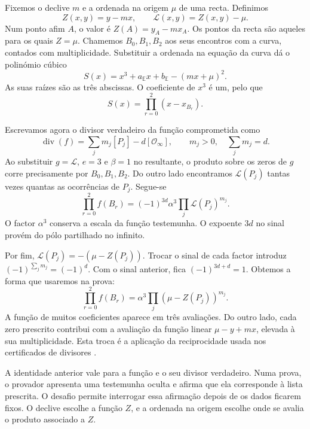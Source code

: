 Fixemos o declive \(m\) e a ordenada na origem
\(\mu\) de uma recta. Definimos
\begin{equation}
 Z(x,y)=y-mx,
 \qquad
 \mathcal L(x,y)=Z(x,y)-\mu.
 \label{eq:fcmp-random-line}
\end{equation}
Num ponto afim \(A\), o valor é
\(Z(A)=y_A-mx_A\). Os pontos da recta são aqueles para os quais
\(Z=\mu\). Chamemos \(B_0,B_1,B_2\) aos seus
encontros com a curva, contados com multiplicidade. Substituir a
ordenada na equação da curva dá o polinómio cúbico
\[
 S(x)=x^3+a_{\mathbb E}x+b_{\mathbb E}
      -(mx+\mu)^2.
\]
As suas raízes são as três abscissas. O coeficiente de \(x^3\)
é um, pelo que
\[
 S(x)=\prod_{r=0}^2(x-x_{B_r}).
\]

Escrevamos agora o divisor verdadeiro da função comprometida como
\[
 \operatorname{div}(f)=\sum_j m_j[P_j]-d[\mathcal O_\infty],
 \qquad m_j>0,\quad\sum_jm_j=d.
\]
Ao substituir \(g=\mathcal L\), \(e=3\) e \(\beta=1\) no resultante,
o produto sobre os zeros de \(g\) corre precisamente por
\(B_0,B_1,B_2\). Do outro lado encontramos
\(\mathcal L(P_j)\) tantas vezes quantas as ocorrências de \(P_j\).
Segue-se
\begin{equation}
 \prod_{r=0}^2 f(B_r)
 =(-1)^{3d}\alpha^3\prod_j\mathcal L(P_j)^{m_j}.
 \label{eq:divisors-line-product-signed}
\end{equation}
O factor \(\alpha^3\) conserva a escala da função testemunha. O
expoente \(3d\) no sinal provém do pólo partilhado no infinito.

Por fim,
\(\mathcal L(P_j)=-(\mu-Z(P_j))\). Trocar o sinal
de cada factor introduz \((-1)^{\sum_jm_j}=(-1)^d\).
Com o sinal anterior, fica \((-1)^{3d+d}=1\). Obtemos a forma
que usaremos na prova:
\begin{equation}
 \prod_{r=0}^2 f(B_r)
 =\alpha^3\prod_j(\mu-Z(P_j))^{m_j}.
 \label{eq:divisors-line-product}
\end{equation}
A função de muitos coeficientes aparece em três avaliações. Do
outro lado, cada zero prescrito contribui com a avaliação da função
linear \(\mu-y+mx\), elevada à sua
multiplicidade. Esta troca é a aplicação da reciprocidade usada
nos certificados de divisores \cite{eagen-divisors}.


A identidade anterior vale para a função e o seu divisor verdadeiro.
Numa prova, o provador apresenta uma testemunha oculta e afirma que
ela corresponde à lista prescrita. O desafio permite interrogar essa
afirmação depois de os dados ficarem fixos. O declive escolhe a
função \(Z\), e a ordenada na origem escolhe onde se avalia o
produto associado a \(Z\).

